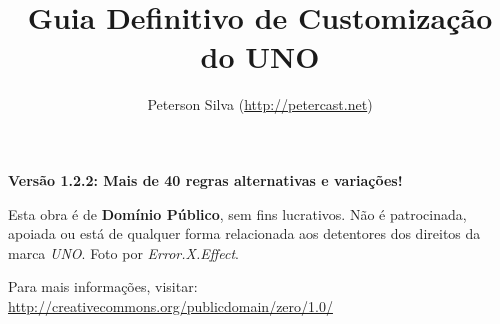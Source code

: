 \documentclass[a5paper,10pt,final,openright]{memoir}
\title{Guia Definitivo de Customização do UNO}
\author{Peterson Silva (\url{http://petercast.net})}
\date{}
\begin{document}

\maketitle

\begin{center}
\textbf{Versão 1.2.2: Mais de 40 regras alternativas e variações!}
\end{center}

\begin{figure}[!h]
\centering
{}
\end{figure}

\thispagestyle{empty}

\begin{center}
Esta obra é de \textbf{Domínio Público}, sem fins lucrativos. Não é patrocinada, apoiada ou está de qualquer forma relacionada aos detentores dos direitos da marca \textit{UNO}. Foto por \textit{Error.X.Effect}.
\end{center}

\begin{center}
Para mais informações, visitar: \\

\url{http://creativecommons.org/publicdomain/zero/1.0/}
\end{center}


\end{document}
